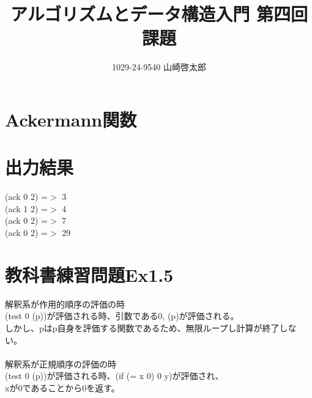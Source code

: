 ﻿\documentclass[a4paper,12pt]{article}
\title{アルゴリズムとデータ構造入門 第四回課題}
\author{1029-24-9540 山崎啓太郎}
\begin{document}
\maketitle

\section{Ackermann関数}
\lstset{numbers=left,basicstyle=\small}


\section{出力結果}
(ack 0 2) =$>$ 3\\
(ack 1 2) =$>$ 4\\
(ack 0 2) =$>$ 7\\
(ack 0 2) =$>$ 29\\

\section{教科書練習問題Ex1.5}
{\large 解釈系が作用的順序の評価の時}\\
(test 0 (p))が評価される時、引数である0, (p)が評価される。\\
しかし、pはp自身を評価する関数であるため、無限ループし計算が終了しない。\\
\\
{\large 解釈系が正規順序の評価の時}\\
(test 0 (p))が評価される時、(if (= x 0) 0 y)が評価され、\\
xが0であることから0を返す。\\
\end{document}
